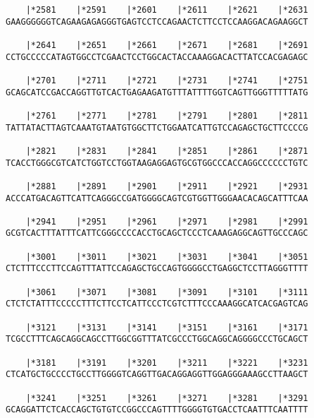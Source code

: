 \documentclass{article}
\begin{document}
\begin{Verbatim}
    |*2581    |*2591    |*2601    |*2611    |*2621    |*2631
GAAGGGGGGTCAGAAGAGAGGGTGAGTCCTCCAGAACTCTTCCTCCAAGGACAGAAGGCT
                                                            
    |*2641    |*2651    |*2661    |*2671    |*2681    |*2691
CCTGCCCCCATAGTGGCCTCGAACTCCTGGCACTACCAAAGGACACTTATCCACGAGAGC
                                                            
    |*2701    |*2711    |*2721    |*2731    |*2741    |*2751
GCAGCATCCGACCAGGTTGTCACTGAGAAGATGTTTATTTTGGTCAGTTGGGTTTTTATG
                                                            
    |*2761    |*2771    |*2781    |*2791    |*2801    |*2811
TATTATACTTAGTCAAATGTAATGTGGCTTCTGGAATCATTGTCCAGAGCTGCTTCCCCG
                                                            
    |*2821    |*2831    |*2841    |*2851    |*2861    |*2871
TCACCTGGGCGTCATCTGGTCCTGGTAAGAGGAGTGCGTGGCCCACCAGGCCCCCCTGTC
                                                            
    |*2881    |*2891    |*2901    |*2911    |*2921    |*2931
ACCCATGACAGTTCATTCAGGGCCGATGGGGCAGTCGTGGTTGGGAACACAGCATTTCAA
                                                            
    |*2941    |*2951    |*2961    |*2971    |*2981    |*2991
GCGTCACTTTATTTCATTCGGGCCCCACCTGCAGCTCCCTCAAAGAGGCAGTTGCCCAGC
                                                            
    |*3001    |*3011    |*3021    |*3031    |*3041    |*3051
CTCTTTCCCTTCCAGTTTATTCCAGAGCTGCCAGTGGGGCCTGAGGCTCCTTAGGGTTTT
                                                            
    |*3061    |*3071    |*3081    |*3091    |*3101    |*3111
CTCTCTATTTCCCCCTTTCTTCCTCATTCCCTCGTCTTTCCCAAAGGCATCACGAGTCAG
                                                            
    |*3121    |*3131    |*3141    |*3151    |*3161    |*3171
TCGCCTTTCAGCAGGCAGCCTTGGCGGTTTATCGCCCTGGCAGGCAGGGGCCCTGCAGCT
                                                            
    |*3181    |*3191    |*3201    |*3211    |*3221    |*3231
CTCATGCTGCCCCTGCCTTGGGGTCAGGTTGACAGGAGGTTGGAGGGAAAGCCTTAAGCT
                                                            
    |*3241    |*3251    |*3261    |*3271    |*3281    |*3291
GCAGGATTCTCACCAGCTGTGTCCGGCCCAGTTTTGGGGTGTGACCTCAATTTCAATTTT
                                                            

\end{Verbatim}
\end{document}
